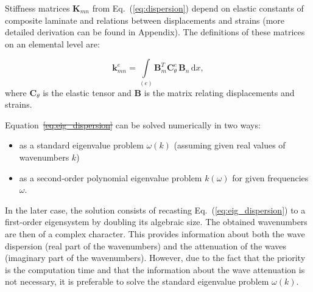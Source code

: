 \documentclass[preprint,12pt]{elsarticle}
\newcommand{\matr}[1]{\mathbf{#1}} %
\newcommand{\ud}{\mathrm{d}}
\providecommand{\DIFaddtex}[1]{{\protect\color{blue}\uwave{#1}}} %
\providecommand{\DIFdeltex}[1]{{\protect\color{red}\sout{#1}}}                      %
\providecommand{\DIFaddbegin}{} %
\providecommand{\DIFaddend}{} %
\providecommand{\DIFdelbegin}{} %
\providecommand{\DIFdelend}{} %
\providecommand{\DIFadd}[1]{\texorpdfstring{\DIFaddtex{#1}}{#1}} %
\providecommand{\DIFdel}[1]{\texorpdfstring{\DIFdeltex{#1}}{}} %
\begin{document}
	Stiffness matrices $\matr{K}_{mn}$ from Eq.~(\ref{eq:dispersion}) depend on elastic constants of composite laminate and relations between displacements and strains (more detailed derivation can be found in Appendix). The definitions of these matrices on an elemental level are:

	\begin{equation}
	\matr{k}_{mn}^e= \int \limits_{(e)} \matr{B}_m^{T} \matr{C}_{\theta}^e \, \matr{B}_n\, \ud x, 
	\label{eq:stiffness_matrix_e}
	\end{equation}
	where $\matr{C}_{\theta}$ is the elastic tensor and $\matr{B}$ is the matrix relating displacements and strains.

	Equation~\DIFdelbegin \DIFdel{\ref{eq:eig_dispersion} }\DIFdelend \DIFaddbegin \DIFadd{(\ref{eq:eig_dispersion}) }\DIFaddend can be solved numerically in two ways:
	\begin{itemize}
		\item as a standard eigenvalue problem $\omega (k)$ (assuming given real values of wavenumbers $k$)
		\item as a second-order polynomial eigenvalue problem $k(\omega)$ for given frequencies $\omega$.
	\end{itemize}
In the later case, the solution consists of recasting Eq.~(\ref{eq:eig_dispersion}) to a first-order eigensystem by doubling its algebraic size.  The obtained wavenumbers are then of a complex character. This provides information about both the wave dispersion (real part of the wavenumbers) and the attenuation of the waves (imaginary part of the wavenumbers).  However, due to the fact that the priority is the computation time and that the information about the wave attenuation is not necessary, it is preferable to solve the standard eigenvalue problem $\omega (k)$.
\end{document}
